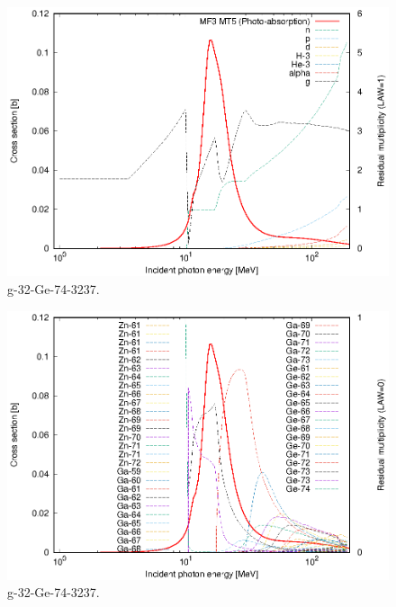 \begin{figure}
 \includegraphics[width=\linewidth]{eps/g_32-Ge-74_3237.eps}
  \caption{g-32-Ge-74-3237.}
\end{figure}
\begin{figure}
 \includegraphics[width=\linewidth]{eps-law0/g_32-Ge-74_3237.eps}
 \caption{g-32-Ge-74-3237.}
\end{figure}
\newpage \clearpage

